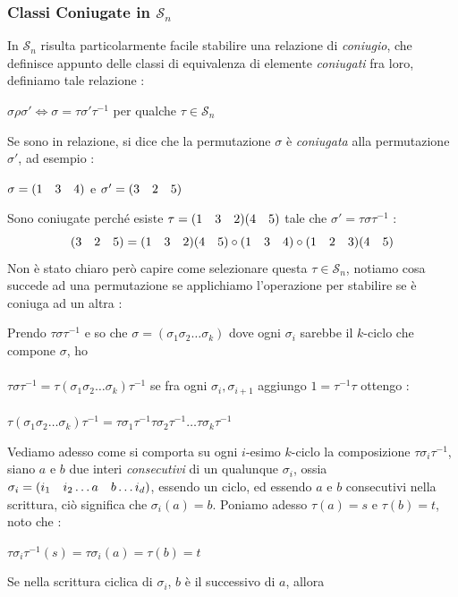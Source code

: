 \documentclass[12pt, letterpaper]{article}
\newcommand{\Sn}{{\mathcal S_n}}
\newcommand{\spaz}{{\text{\hphantom{aa}}}}
\newcommand{\acc}{\\\hphantom{}\\}
\begin{document}
\subsubsection{Classi Coniugate in \(\Sn\)}
In \(\Sn\) risulta particolarmente facile stabilire una relazione di \textit{coniugio}, che definisce appunto delle 
classi di equivalenza di elemente \textit{coniugati} fra loro, definiamo tale relazione : \begin{center}
    \(\sigma\rho\sigma'\iff\sigma=\tau\sigma'\tau^{-1}\) per qualche \(\tau\in\Sn\)
\end{center}
Se sono in relazione, si dice che la permutazione  \(\sigma\) è \textit{coniugata} 
alla permutazione \(\sigma'\), ad esempio : \begin{center}
    \(\sigma = (1\spaz 3\spaz 4)\) \hphantom{tex}e\hphantom{tex} \(\sigma' = (3\spaz 2\spaz 5)\)
\end{center}
Sono coniugate perché esiste \(\tau=(1\spaz3\spaz2)(4\spaz5)\) tale che \(\sigma'=\tau\sigma\tau^{-1}\) :\begin{equation}
    (3\spaz2\spaz5)=(1\spaz3\spaz2)(4\spaz 5)\circ(1\spaz3\spaz4)\circ(1\spaz2\spaz3)(4\spaz 5)
\end{equation}
Non è stato chiaro però capire come selezionare questa \(\tau\in\Sn\), notiamo cosa succede 
ad una permutazione se applichiamo l'operazione per stabilire se è coniuga ad un altra :
\begin{center}
    Prendo \(\tau\sigma\tau^{-1}\) e so che \(\sigma=(\sigma_1\sigma_2\dots \sigma_k)\) dove ogni \(\sigma_i\) sarebbe 
    il \(k\)-ciclo che compone \(\sigma\), ho \acc
    \(\tau\sigma\tau^{-1}=\tau(\sigma_1\sigma_2\dots \sigma_k)\tau^{-1}\) se fra ogni \(\sigma_i,\sigma_{i+1}\) aggiungo \(1=\tau^{-1}\tau\)
    ottengo :\acc
    \(\tau(\sigma_1\sigma_2\dots \sigma_k)\tau^{-1}=\tau\sigma_1\tau^{-1}\tau\sigma_2\tau^{-1}\dots\tau\sigma_k\tau^{-1}\)
\end{center}
Vediamo adesso come si comporta su ogni \(i\)-esimo \(k\)-ciclo la composizione \(\tau\sigma_i\tau^{-1}\), siano 
\(a\) e \(b\) due interi \textit{consecutivi} di un qualunque \(\sigma_i\), ossia \(\sigma_i=(i_1\spaz i_2\dots a\spaz b\dots i_d)\), 
essendo un ciclo, ed essendo \(a\) e \(b\) consecutivi nella scrittura, ciò significa che \(\sigma_i(a)=b\). Poniamo 
adesso \(\tau(a)=s\) e \(\tau(b)=t\), noto che :\begin{center}
    \(
    \tau\sigma_i\tau^{-1}(s) =\tau\sigma_i(a)=\tau(b)=t   
    \)
\end{center}
Se nella scrittura ciclica di \(\sigma_i \), \(b\) è il successivo di \(a\), allora 
\end{document}

